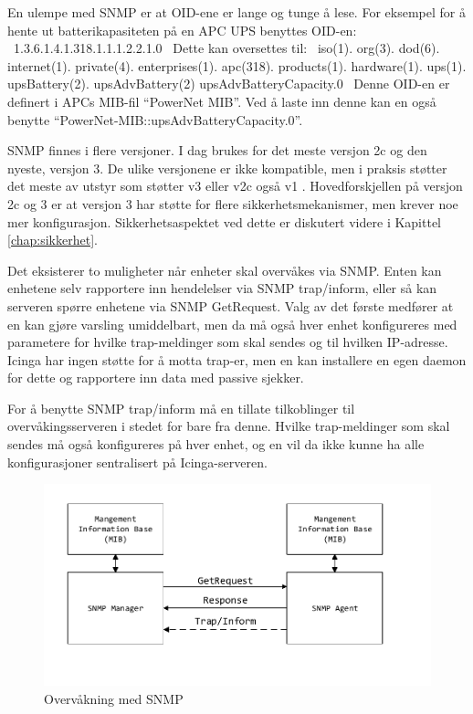 En ulempe med SNMP er at OID-ene er lange og tunge å lese. For eksempel for å hente ut batterikapasiteten på en APC UPS benyttes OID-en:
\
1.3.6.1.4.1.318.1.1.1.2.2.1.0
\
Dette kan oversettes til:
\
iso(1). org(3). dod(6). internet(1). private(4). enterprises(1). apc(318). products(1). hardware(1). ups(1). upsBattery(2). upsAdvBattery(2) upsAdvBatteryCapacity.0
\
Denne OID-en er definert i APCs MIB-fil ``PowerNet MIB''. Ved å laste inn denne kan en også benytte ``PowerNet-MIB::upsAdvBatteryCapacity.0''.

SNMP finnes i flere versjoner. I dag brukes for det meste versjon 2c og den nyeste, versjon 3. De ulike versjonene er ikke kompatible, men i praksis støtter det meste av utstyr som støtter v3 eller v2c også v1 \cite{rfc3584}. Hovedforskjellen på versjon 2c og 3 er at versjon 3 har støtte for flere sikkerhetsmekanismer, men krever noe mer konfigurasjon. Sikkerhetsaspektet ved dette er diskutert videre i Kapittel \ref{chap:sikkerhet}.

Det eksisterer to muligheter når enheter skal overvåkes via SNMP. Enten kan enhetene selv rapportere inn hendelelser via SNMP trap/inform, eller så kan serveren spørre enhetene via SNMP GetRequest. Valg av det første medfører at en kan gjøre varsling umiddelbart, men da må også hver enhet konfigureres med parametere for hvilke trap-meldinger som skal sendes og til hvilken IP-adresse. Icinga har ingen støtte for å motta trap-er, men en kan installere en egen daemon for dette og rapportere inn data med passive sjekker. 

For å benytte SNMP trap/inform må en tillate tilkoblinger til overvåkingsserveren i stedet for bare fra denne. Hvilke trap-meldinger som skal sendes må også konfigureres på hver enhet, og en vil da ikke kunne ha alle konfigurasjoner sentralisert på Icinga-serveren.

\begin{figure}[H]
    \centering
    \includegraphics{img/SNMP}
    \caption{Overvåkning med SNMP}
    \label{SNMP}
\end{figure}

